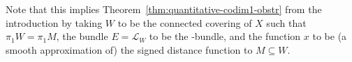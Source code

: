  Note that this implies Theorem~\ref{thm:quantitative-codim1-obstr} from the introduction by taking \(W\) to be the connected covering of \(X\) such that \(\pi_1 W = \pi_1 M\), the bundle \(E = \mathcal{L}_W\) to be the \Mishchenko-bundle, and the function \(x\) to be (a smooth approximation of) the signed distance function to \(M \subseteq W\).
